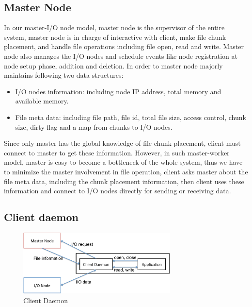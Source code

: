 \subsection{Master Node}
In our master-I/O node model, master node is the supervisor of the entire system,
master node is in charge of interactive with client, make file chunk placement, and handle file operations including file open, read and write.
Master node also manages the I/O nodes and schedule events like node registration at node setup
phase, addition and deletion.
In order to master node majorly maintains following two data structures:
\begin{itemize}
  \item I/O nodes information: including node IP address, total memory and
  available memory. 
  \item File meta data: including file path, file id, total file size, access control, chunk size,
  dirty flag and a map from chunks to I/O nodes.
\end{itemize}

Since only master has the global knowledge of file chunk placement, client must connect to master
to get these information.
However, in such master-worker model, master is easy to become a bottleneck of the whole system,
thus we have to minimize the master involvement in file operation, client asks master about the
file meta data, including the chunk placement information, then client uses these information and
connect to I/O nodes directly for sending or receiving data.

\subsection{Client daemon}

\begin{figure}[tb]
	\centering
	\includegraphics[width=8cm]{img/client_daemon}
	\caption{Client Daemon}
	\label{implementaion:client_daemon}
\end{figure}

